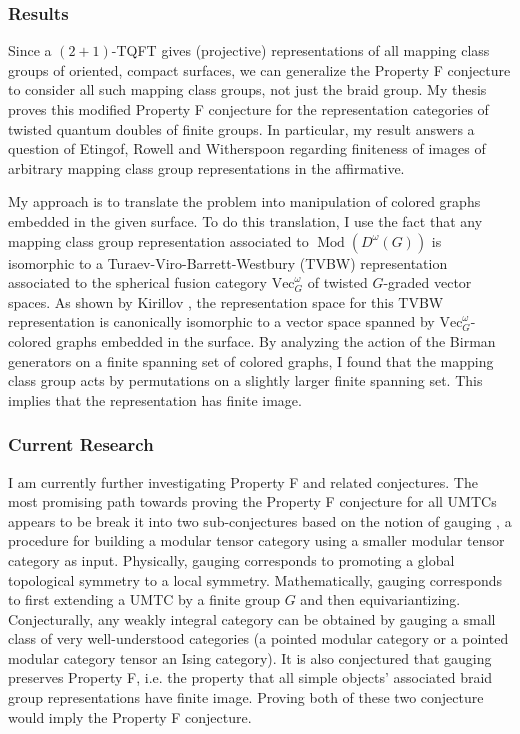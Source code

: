 \documentclass[12pt]{article}
\DeclareMathOperator{\Mod}{Mod}
\theoremstyle{plain} \numberwithin{equation}{section}
\theoremstyle{definition}
\begin{document}
\subsubsection*{Results}

Since a $(2+1)$-TQFT gives (projective) representations of all mapping class groups of oriented, compact surfaces, we can generalize the Property F conjecture to consider all such mapping class groups, not just the braid group. My thesis proves this modified Property F conjecture for the representation categories of twisted quantum doubles of finite groups.  In particular, my result answers a question of Etingof, Rowell and Witherspoon \cite{erw} regarding finiteness of images of arbitrary mapping class group representations in the affirmative.

My approach is to translate the problem into manipulation of colored graphs embedded in the given surface. To do this translation, I use the fact that any mapping class group representation associated to $\Mod(D^\omega(G))$ is isomorphic to a Turaev-Viro-Barrett-Westbury (TVBW) representation \cite{bw} associated to the spherical fusion category $\text{Vec}_G^\omega$ of twisted $G$-graded vector spaces. As shown by Kirillov \cite{k} , the representation space for this TVBW representation is canonically isomorphic to a vector space spanned by $\text{Vec}_G^\omega$-colored graphs embedded in the surface. By analyzing the action of the Birman generators \cite{birman} on a finite spanning set of colored graphs, I found that the mapping class group acts by permutations on a slightly larger finite spanning set. This implies that the representation has finite image.

\subsubsection*{Current Research}

I am currently further investigating Property F and related conjectures.  The most promising path towards proving the Property F conjecture for all UMTCs appears to be break it into two sub-conjectures based on the notion of gauging \cite{bbcw}, a procedure for building a modular tensor category using  a smaller modular tensor category as input.   Physically, gauging corresponds to promoting a global topological symmetry to a local symmetry.  Mathematically, gauging corresponds to first extending a UMTC by a finite group $G$ and then equivariantizing. Conjecturally, any weakly integral category can be obtained by gauging a small class of very well-understood categories (a pointed modular category or a pointed modular category tensor an Ising category).   It is also conjectured that gauging  preserves Property F, i.e. the property that all simple objects’ associated braid group representations have finite image.  Proving both of these two conjecture would imply the Property F conjecture.
\end{document}

